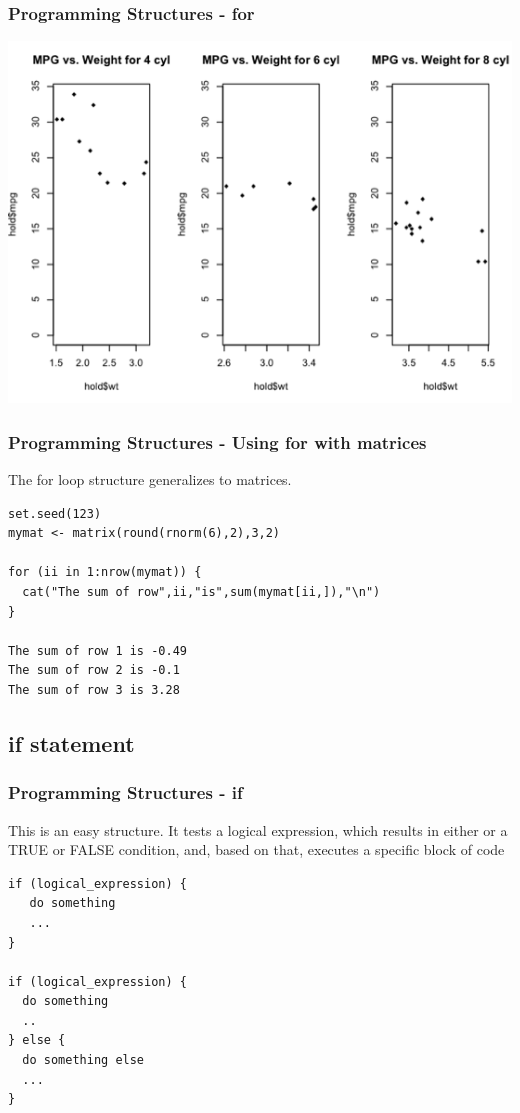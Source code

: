 \documentclass{beamer}
\begin{document}
\begin{frame}[fragile]
\frametitle{Programming Structures - for }
\begin{center}
\includegraphics{../IMG/threeplot.png}
\end{center}
\end{frame}

%

\begin{frame}[fragile]
\frametitle{Programming Structures - Using for with matrices}
The for loop structure generalizes to matrices. 
\begin{verbatim}
set.seed(123)
mymat <- matrix(round(rnorm(6),2),3,2)

for (ii in 1:nrow(mymat)) {
  cat("The sum of row",ii,"is",sum(mymat[ii,]),"\n")
}

The sum of row 1 is -0.49 
The sum of row 2 is -0.1 
The sum of row 3 is 3.28 
\end{verbatim}
\end{frame}

%

\subsection{if statement}
\begin{frame}[fragile]
\frametitle{Programming Structures - if}
This is an easy structure. It tests a logical expression, which results in either or a TRUE or FALSE condition, and, based on that, executes a specific block of code 
\small
\begin{verbatim}
if (logical_expression) {
   do something
   ...
}
 
if (logical_expression) {
  do something
  ..
} else {
  do something else
  ...
}
\end{verbatim}
\end{frame}
\end{document}
